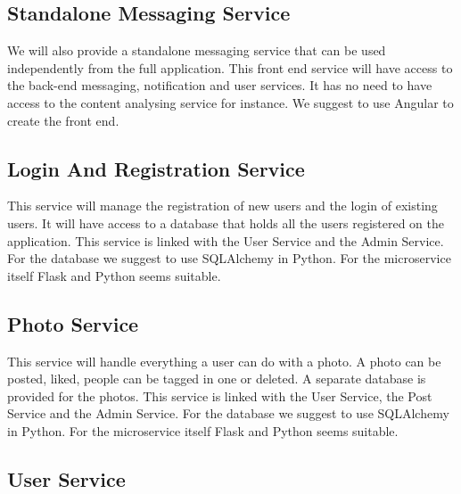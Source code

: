 \documentclass[a4paper,12pt]{article}
\begin{document}
\subsection{Standalone Messaging Service}

We will also provide a standalone messaging service that can be used independently from the full application. This front end service will have access to the back-end messaging, notification and user services. It has no need to have access to the content analysing service for instance.
\newline
\newline
We suggest to use Angular to create the front end.

\subsection{Login And Registration Service}

This service will manage the registration of new users and the login of existing users. It will have access to a database that holds all the users registered on the application.
\newline
\newline
This service is linked with the User Service and the Admin Service.
\newline
\newline
For the database we suggest to use SQLAlchemy in Python. For the microservice itself Flask and Python seems suitable.

\subsection{Photo Service}

This service will handle everything a user can do with a photo. A photo can be posted, liked, people can be tagged in one or deleted. A separate database is provided for the photos.
\newline
\newline
This service is linked with the User Service, the Post Service and the Admin Service.
\newline
\newline
For the database we suggest to use SQLAlchemy in Python. For the microservice itself Flask and Python seems suitable.

\subsection{User Service}
\end{document}
